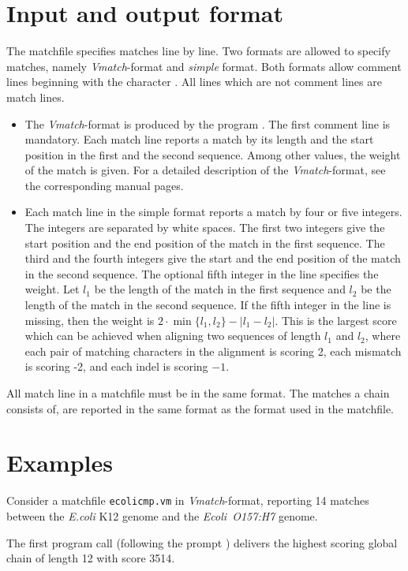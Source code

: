 \documentclass[12pt]{article}
\newcommand{\Size}[1]{|#1|}
\newcommand{\EXECUTE}[1]{}
\begin{document}
\section{Input and output format}
The matchfile specifies matches line by line.
Two formats are allowed to specify matches, namely \textit{Vmatch}-format
and \emph{simple} format. Both formats allow comment lines beginning with
the character \texttt{}. All lines which are not comment
lines are match lines.
\begin{itemize}
\item
The \textit{Vmatch}-format is produced by the program \VM.
The first comment line is mandatory.  Each match line
reports a match by its length and the start position in the first 
and the second sequence. Among other values,
the weight of the match is given. For a detailed description of
the \textit{Vmatch}-format, see the corresponding manual pages.
\item
Each match line in the simple format reports a match by four or 
five integers. The integers are separated by white spaces. 
The first two integers give the start position and the end
position of the match in the first sequence. 
The third and the fourth integers give the start and the end
position of the match in the second sequence. The optional fifth
integer in the line specifies the weight. Let \(l_{1}\) be the 
length of the match in the first sequence and \(l_{2}\) be the
length of the match in the second sequence. If the fifth integer in the
line is missing, then the weight is 
\(2\cdot\min\{l_{1},l_{2}\}-\Size{l_{1}-l_{2}}\).
This is the largest score which can be achieved when aligning two
sequences of length \(l_{1}\) and \(l_{2}\), where each pair of
matching characters in the alignment is scoring 2, each mismatch is scoring
-2, and each indel is scoring $-1$.
\end{itemize}
All match line in a matchfile must be in the same format.
The matches a chain consists of, are reported in the same format as the
format used in the matchfile.
\section{Examples}

Consider a matchfile \texttt{ecolicmp.vm} in \textit{Vmatch}-format, reporting
14 matches between the \emph{E.coli} K12 genome and the 
\emph{Ecoli~O157:H7} genome.

\EXECUTE{cat ecolicmp.vm}

The first program call (following the prompt \texttt{})
delivers the highest scoring global chain of length 12 with score 3514.
\end{document}
